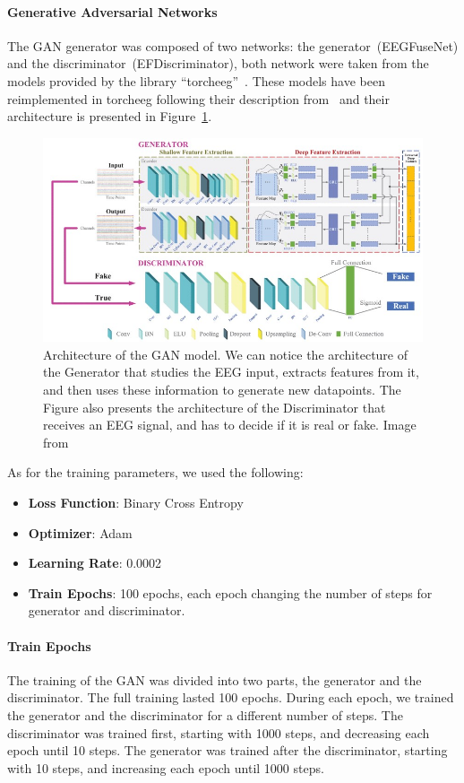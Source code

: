 \paragraph*{Generative Adversarial Networks}
The GAN generator was composed of two networks: the generator~(EEGFuseNet) and the discriminator~(EFDiscriminator), both network were taken from the models provided by the library ``torcheeg''~\cite{zhang2024torcheeg}.
These models have been reimplemented in torcheeg following their description from~\cite{liang2021eegfusenet} and their architecture is presented in Figure~\ref{fig:gan_paper}.
\begin{figure}[!htbp]
    \centering
    \includegraphics[width=\textwidth]{Figures/Methodology/GAN}
    \caption{Architecture of the GAN model. 
    We can notice the architecture of the Generator that studies the EEG input, extracts features from it, and then uses these information to generate new datapoints. 
    The Figure also presents the architecture of the Discriminator that receives an EEG signal, and has to decide if it is real or fake. Image from~\cite{liang2021eegfusenet}}\label{fig:gan_paper}
\end{figure}


As for the training parameters, we used the following:
\begin{itemize}
    \item \textbf{Loss Function}: Binary Cross Entropy
    \item \textbf{Optimizer}: Adam
    \item \textbf{Learning Rate}: 0.0002
    \item \textbf{Train Epochs}: 100 epochs, each epoch changing the number of steps for generator and discriminator.
\end{itemize}
\paragraph*{Train Epochs}
The training of the GAN was divided into two parts, the generator and the discriminator.
The full training lasted 100 epochs.
During each epoch, we trained the generator and the discriminator for a different number of steps.
The discriminator was trained first, starting with 1000 steps, and decreasing each epoch until 10 steps.
The generator was trained after the discriminator, starting with 10 steps, and increasing each epoch until 1000 steps.


